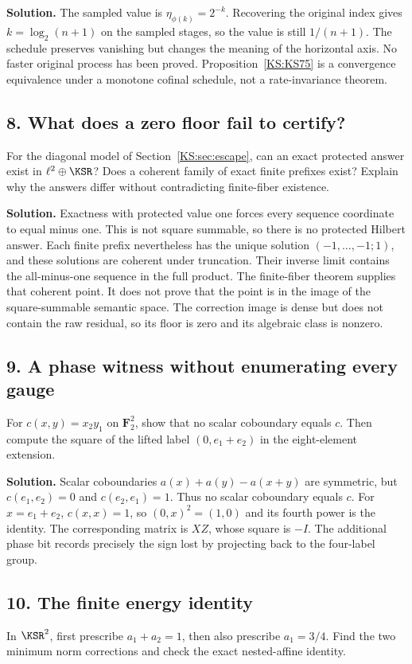 \documentclass[11pt,oneside,openany]{book}
\numberwithin{equation}{section}
\begin{document}
\textbf{Solution.} The sampled value is $\eta_{\phi(k)}=2^{-k}$. Recovering the original index gives $k=\log_2(n+1)$ on the sampled stages, so the value is still $1/(n+1)$. The schedule preserves vanishing but changes the meaning of the horizontal axis. No faster original process has been proved. Proposition~\ref{KS:KS75} is a convergence equivalence under a monotone cofinal schedule, not a rate-invariance theorem.

\subsection*{8. What does a zero floor fail to certify?}
For the diagonal model of Section~\ref{KS:sec:escape}, can an exact protected answer exist in $\ell^2\oplus\KSR$? Does a coherent family of exact finite prefixes exist? Explain why the answers differ without contradicting finite-fiber existence.

\textbf{Solution.} Exactness with protected value one forces every sequence coordinate to equal minus one. This is not square summable, so there is no protected Hilbert answer. Each finite prefix nevertheless has the unique solution $(-1,\ldots,-1;1)$, and these solutions are coherent under truncation. Their inverse limit contains the all-minus-one sequence in the full product. The finite-fiber theorem supplies that coherent point. It does not prove that the point is in the image of the square-summable semantic space. The correction image is dense but does not contain the raw residual, so its floor is zero and its algebraic class is nonzero.

\subsection*{9. A phase witness without enumerating every gauge}
For $c(x,y)=x_2y_1$ on $\mathbf F_2^2$, show that no scalar coboundary equals $c$. Then compute the square of the lifted label $(0,e_1+e_2)$ in the eight-element extension.

\textbf{Solution.} Scalar coboundaries $a(x)+a(y)-a(x+y)$ are symmetric, but $c(e_1,e_2)=0$ and $c(e_2,e_1)=1$. Thus no scalar coboundary equals $c$. For $x=e_1+e_2$, $c(x,x)=1$, so $(0,x)^2=(1,0)$ and its fourth power is the identity. The corresponding matrix is $XZ$, whose square is $-I$. The additional phase bit records precisely the sign lost by projecting back to the four-label group.

\subsection*{10. The finite energy identity}
In $\KSR^2$, first prescribe $a_1+a_2=1$, then also prescribe $a_1=3/4$. Find the two minimum norm corrections and check the exact nested-affine identity.
\end{document}
